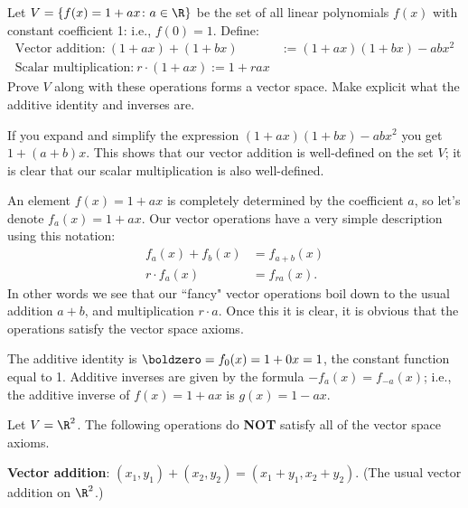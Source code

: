 \ii Let $V=\{f(x)=1+ax\colon a\in\R\}$ be the set of all linear polynomials $f(x)$ with constant coefficient 1: i.e., $f(0)=1$. Define:
\begin{align*}
\text{Vector addition:} \ (1+ax)+(1+bx)&:= (1+ax)(1+bx)-abx^2\\
\text{Scalar multiplication:}\  r\cdot (1+ax):=1+rax 
\end{align*}
Prove $V$ along with these operations forms a vector space. Make explicit what the additive identity and inverses are. 
\\
\begin{solution}
If you expand and simplify the expression $(1+ax)(1+bx)-abx^2$ you get $1+(a+b)x$. This shows that our vector addition is well-defined on the set $V$; it is clear that our scalar multiplication is also well-defined. 

An element $f(x)=1+ax$ is completely determined by the coefficient $a$, so let's denote $f_a(x)=1+ax$. Our vector operations have a very simple description using this notation:
\begin{align*}
f_a(x)+f_b(x)&=f_{a+b}(x)\\
r\cdot f_a(x)&=f_{ra}(x).
\end{align*}
In other words we see that our ``fancy" vector operations boil down to the usual addition $a+b$, and multiplication $r\cdot a$. Once this it is clear, it is obvious that the operations satisfy the vector space axioms. 

The additive identity is $\boldzero=f_0(x)=1+0x=1$, the constant function equal to 1. Additive inverses are given by the formula $-f_a(x)=f_{-a}(x)$; i.e., the additive inverse of $f(x)=1+ax$ is $g(x)=1-ax$.  
\end{solution}
\ii Let $V=\R^2$. The following operations do {\bf NOT} satisfy all of the vector space axioms. 

{\bf Vector addition}: $(x_1,y_1)+(x_2,y_2)=(x_1+y_1,x_2+y_2)$. (The usual vector addition on $\R^2$.)

